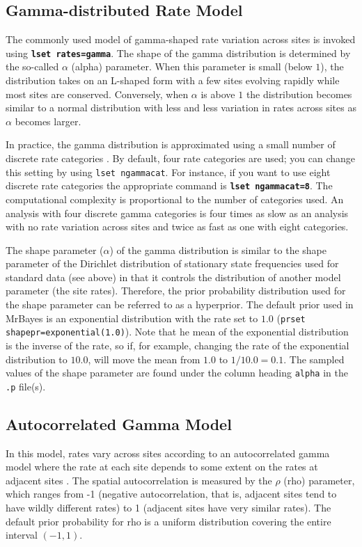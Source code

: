 \documentclass[12pt]{book}
\newcommand{\ttt}[1]{\texttt{#1}}
\newcommand{\tb}[1]{\ttt{\textbf{#1}}}
\begin{document}
\subsection{Gamma-distributed Rate Model}
\label{gammaDistributedRateModel}
The commonly used model of gamma-shaped rate variation across sites is invoked using \tb{lset
rates=gamma}. The shape of the gamma distribution is determined by the so-called $\alpha$ (alpha)
parameter. When this parameter is small (below $1$), the distribution takes on an L-shaped form with
a few sites evolving rapidly while most sites are conserved. Conversely, when $\alpha$ is above $1$
the distribution becomes similar to a normal distribution with less and less variation in rates
across sites as $\alpha$ becomes larger.

In practice, the gamma distribution is approximated using a small number of discrete rate
categories \citep{yang94a}. By default, four rate categories are used; you can change this setting
by using \ttt{lset ngammacat}. For instance, if you want to use eight discrete rate categories the
appropriate command is \tb{lset ngammacat=8}. The computational complexity is proportional to the
number of categories used. An analysis with four discrete gamma categories is four times as slow as
an analysis with no rate variation across sites and twice as fast as one with eight categories.

The shape parameter ($\alpha$) of the gamma distribution is similar to the shape parameter of the
Dirichlet distribution of stationary state frequencies used for standard data (see above) in that
it controls the distribution of another model parameter (the site rates). Therefore, the prior
probability distribution used for the shape parameter can be referred to as a hyperprior. The
default prior used in MrBayes is an exponential distribution with the rate set to $1.0$ (\ttt{prset
shapepr=exponential(1.0)}). Note that he mean of the exponential distribution is the inverse of the
rate, so if, for example, changing the rate of the exponential distribution to $10.0$, will move
the mean from $1.0$ to $1/10.0 = 0.1$. The sampled values of the shape parameter are found under
the column heading \ttt{alpha} in the \ttt{.p} file(s).

\subsection{Autocorrelated Gamma Model}
In this model, rates vary across sites according to an autocorrelated gamma model where the rate at
each site depends to some extent on the rates at adjacent sites \citep{yang95a}. The spatial
autocorrelation is measured by the $\rho$ (rho) parameter, which ranges from -1 (negative
autocorrelation, that is, adjacent sites tend to have wildly different rates) to 1 (adjacent sites
have very similar rates). The default prior probability for rho is a uniform distribution covering
the entire interval $(-1,1)$.
\end{document}
